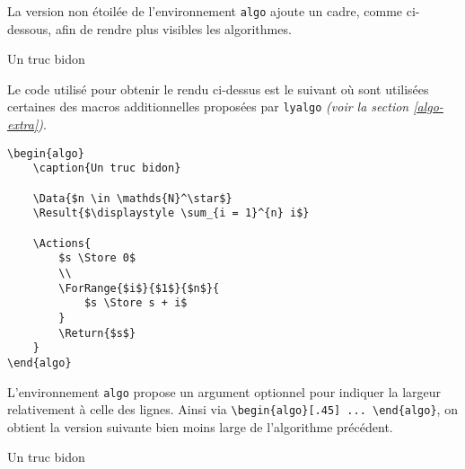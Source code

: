 La version non étoilée de l'environnement \verb+algo+ ajoute un cadre, comme ci-dessous, afin de rendre plus visibles les algorithmes.

\begin{algo}
    \caption{Un truc bidon}


\end{algo} 


\medskip


Le code utilisé pour obtenir le rendu ci-dessus est le suivant où sont utilisées certaines des macros additionnelles proposées par \verb+lyalgo+ \emph{(voir la section \ref{algo-extra})}.

\begin{frame-gene}
    \small
    \begin{verbatim}
\begin{algo}
    \caption{Un truc bidon}

    \Data{$n \in \mathds{N}^\star$}
    \Result{$\displaystyle \sum_{i = 1}^{n} i$}

    \Actions{
        $s \Store 0$
        \\
        \ForRange{$i$}{$1$}{$n$}{
            $s \Store s + i$
        }
        \Return{$s$}
    }
\end{algo}
	\end{verbatim}
\end{frame-gene}


\medskip


L'environnement \verb+algo+ propose un argument optionnel pour indiquer la largeur relativement à celle des lignes.
Ainsi  via \verb+\begin{algo}[.45] ... \end{algo}+, on obtient la version suivante bien moins large de l'algorithme précédent.

\begin{algo}[.45]
    \caption{Un truc bidon}


\end{algo} 



